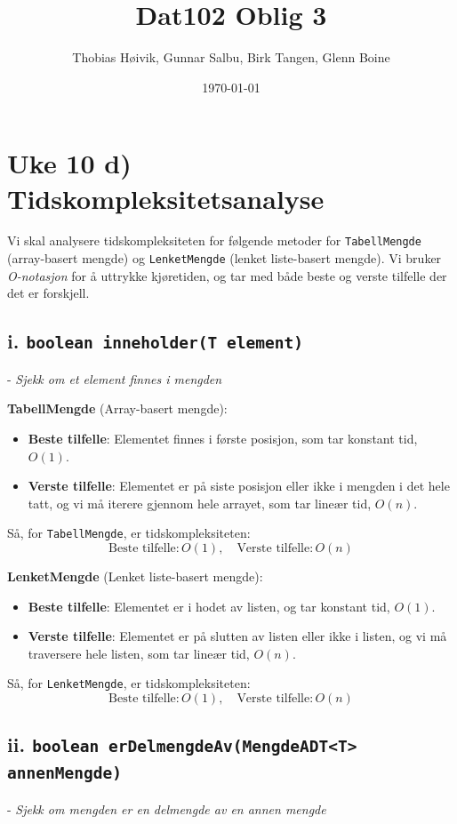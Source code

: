\documentclass[12pt]{article}
\title{Dat102 Oblig 3}
\author{Thobias Høivik, Gunnar Salbu, Birk Tangen, Glenn Boine}
\date{\today}
\begin{document}
\maketitle
\section*{Uke 10 d) Tidskompleksitetsanalyse}

Vi skal analysere tidskompleksiteten for følgende metoder for \texttt{TabellMengde} (array-basert mengde) og \texttt{LenketMengde} (lenket liste-basert mengde). Vi bruker \textit{O-notasjon} for å uttrykke kjøretiden, og tar med både beste og verste tilfelle der det er forskjell.

\subsection*{i. \texttt{boolean inneholder(T element)}} - \textit{Sjekk om et element finnes i mengden}

\textbf{TabellMengde} (Array-basert mengde):
\begin{itemize}
    \item \textbf{Beste tilfelle}: Elementet finnes i første posisjon, som tar konstant tid, \(O(1)\).
    \item \textbf{Verste tilfelle}: Elementet er på siste posisjon eller ikke i mengden i det hele tatt, og vi må iterere gjennom hele arrayet, som tar lineær tid, \(O(n)\).
\end{itemize}

Så, for \texttt{TabellMengde}, er tidskompleksiteten:
\[
\text{Beste tilfelle}: O(1), \quad \text{Verste tilfelle}: O(n)
\]

\textbf{LenketMengde} (Lenket liste-basert mengde):
\begin{itemize}
    \item \textbf{Beste tilfelle}: Elementet er i hodet av listen, og tar konstant tid, \(O(1)\).
    \item \textbf{Verste tilfelle}: Elementet er på slutten av listen eller ikke i listen, og vi må traversere hele listen, som tar lineær tid, \(O(n)\).
\end{itemize}

Så, for \texttt{LenketMengde}, er tidskompleksiteten:
\[
\text{Beste tilfelle}: O(1), \quad \text{Verste tilfelle}: O(n)
\]

\subsection*{ii. \texttt{boolean erDelmengdeAv(MengdeADT<T> annenMengde)}} - \textit{Sjekk om mengden er en delmengde av en annen mengde}
\end{document}
